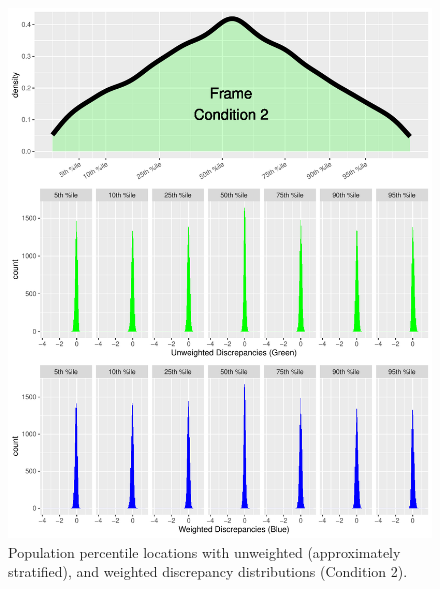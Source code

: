 \documentclass[
  ,man]{apa7}
\begin{document}
\begin{figure}
\centering
\includegraphics{NormsBuilding_files/figure-latex/Figure4-1.pdf}
\caption{\label{fig:Figure4}Population percentile locations with unweighted (approximately stratified), and weighted discrepancy distributions (Condition 2).}
\end{figure}
\end{document}
